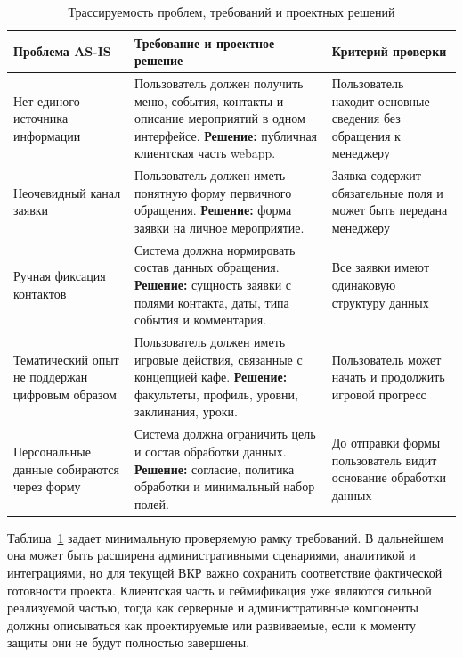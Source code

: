 \begin{table}[H]
\centering
\small
\caption{Трассируемость проблем, требований и проектных решений}
\label{tab:v2_requirements_traceability}
\begin{tabularx}{\textwidth}{|>{\raggedright\arraybackslash}p{}|>{\raggedright\arraybackslash}p{}|>{\raggedright\arraybackslash}X|}
\hline
\textbf{Проблема AS-IS} & \textbf{Требование и проектное решение} & \textbf{Критерий проверки} \\ \hline
Нет единого источника информации & Пользователь должен получить меню, события, контакты и описание мероприятий в одном интерфейсе. \newline \textbf{Решение:} публичная клиентская часть webapp. & Пользователь находит основные сведения без обращения к менеджеру \\ \hline
Неочевидный канал заявки & Пользователь должен иметь понятную форму первичного обращения. \newline \textbf{Решение:} форма заявки на личное мероприятие. & Заявка содержит обязательные поля и может быть передана менеджеру \\ \hline
Ручная фиксация контактов & Система должна нормировать состав данных обращения. \newline \textbf{Решение:} сущность заявки с полями контакта, даты, типа события и комментария. & Все заявки имеют одинаковую структуру данных \\ \hline
Тематический опыт не поддержан цифровым образом & Пользователь должен иметь игровые действия, связанные с концепцией кафе. \newline \textbf{Решение:} факультеты, профиль, уровни, заклинания, уроки. & Пользователь может начать и продолжить игровой прогресс \\ \hline
Персональные данные собираются через форму & Система должна ограничить цель и состав обработки данных. \newline \textbf{Решение:} согласие, политика обработки и минимальный набор полей. & До отправки формы пользователь видит основание обработки данных \\ \hline
\end{tabularx}
\normalsize
\end{table}

Таблица~\ref{tab:v2_requirements_traceability} задает минимальную проверяемую рамку требований. В дальнейшем она может быть расширена административными сценариями, аналитикой и интеграциями, но для текущей ВКР важно сохранить соответствие фактической готовности проекта. Клиентская часть и геймификация уже являются сильной реализуемой частью, тогда как серверные и административные компоненты должны описываться как проектируемые или развиваемые, если к моменту защиты они не будут полностью завершены.

